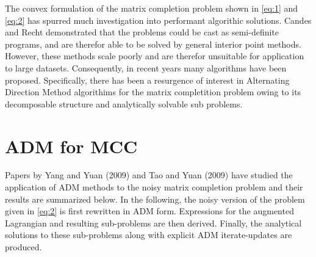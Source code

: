 \documentclass{article}
\begin{document}
The convex formulation of the matrix completion problem shown in \ref{eq:1} and \ref{eq:2} has spurred much investigation into performant algorithic solutions.  Candes and Recht demonstrated that the problems could be cast as semi-definite programs, and are therefor able to be solved by general interior point methods.  However, these methods scale poorly and are therefor unsuitable for application to large datasets.  Consequently, in recent years many algorithms have been proposed.  Specifically, there has been a resurgence of interest in Alternating Direction Method algorithims for the matrix completition problem owing to its decomposable structure and analytically solvable sub problems.

\section{ADM for MCC} \label{ADM for MCC}

Papers by Yang and Yuan (2009) and Tao and Yuan (2009) have studied the application of ADM methods to the noisy matrix completion problem and their results are summarized below.  In the following, the noisy version of the problem given in \ref{eq:2} is first rewritten in ADM form.  Expressions for the augmented Lagrangian and resulting sub-problems are then derived.  Finally, the analytical solutions to these sub-problems along with explicit ADM iterate-updates are produced.
\end{document}
